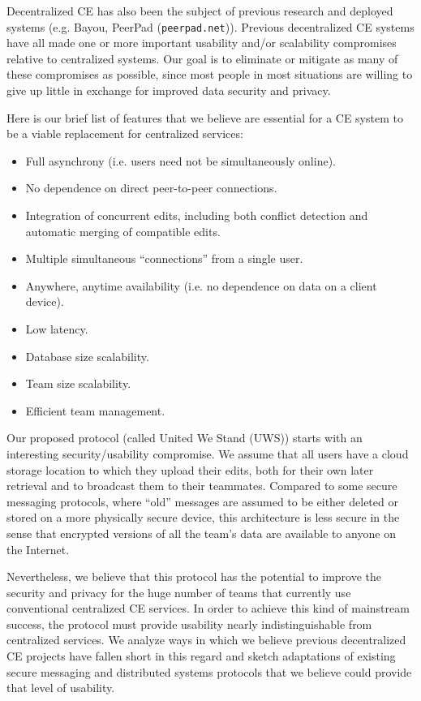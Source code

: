 \documentclass[runningheads]{llncs}
\begin{document}
Decentralized CE has also been the subject of previous research and deployed systems (e.g. Bayou\cite{Terry1995}, PeerPad (\texttt{peerpad.net})).
Previous decentralized CE systems have all made one or more important usability and{\slash}or scalability compromises relative to centralized systems.
Our goal is to eliminate or mitigate as many of these compromises as possible, since most people in most situations are willing to give up little in exchange for improved data security and privacy\cite{Acquisti2013}.

Here is our brief list of features that we believe are essential for a CE system to be a viable replacement for centralized services:

\begin{itemize}
\item Full asynchrony (i.e. users need not be simultaneously online).
\item No dependence on direct peer-to-peer connections.
\item Integration of concurrent edits, including both conflict detection and automatic merging of compatible edits.
\item Multiple simultaneous ``connections'' from a single user.
\item Anywhere, anytime availability (i.e. no dependence on data on a client device).
\item Low latency.
\item Database size scalability.
\item Team size scalability.
\item Efficient team management.
\end{itemize}

Our proposed protocol (called United We Stand (UWS)) starts with an interesting security{\slash}usability compromise.
We assume that all users have a cloud storage location to which they upload their edits, both for their own later retrieval and to broadcast them to their teammates.
Compared to some secure messaging protocols, where ``old'' messages are assumed to be either deleted or stored on a more physically secure device, this architecture is less secure in the sense that encrypted versions of all the team's data are available to anyone on the Internet.

Nevertheless, we believe that this protocol has the potential to improve the security and privacy for the huge number of teams that currently use conventional centralized CE services.
In order to achieve this kind of mainstream success, the protocol must provide usability nearly indistinguishable from centralized services.
We analyze ways in which we believe previous decentralized CE projects have fallen short in this regard and sketch adaptations of existing secure messaging and distributed systems protocols that we believe could provide that level of usability.
\end{document}
